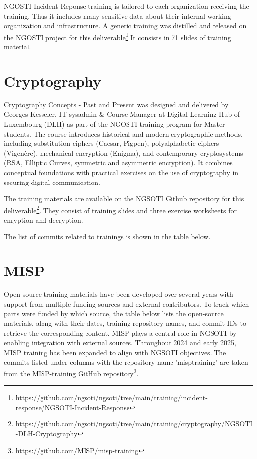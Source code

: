 \documentclass[10pt,a4paper]{report}
\begin{document}
NGOSTI Incident Reponse training is tailored to each organization receiving the
training. Thus it includes many sensitive data about their internal working
organization and infrastructure.
A generic training was distilled and released on the NGOSTI project for this
deliverable\footnote{\url{https://github.com/ngsoti/ngsoti/tree/main/training/incident-response/NGSOTI-Incident-Response}}
It consists in 71 slides of training material.

\section{Cryptography}

Cryptography Concepts - Past and Present was designed and delivered by Georges Kesseler, IT sysadmin \& Course Manager at Digital Learning Hub of Luxembourg (DLH) as part of the NGOSTI training program for Master students. The course introduces historical and modern cryptographic methods, including substitution ciphers (Caesar, Pigpen), polyalphabetic ciphers (Vigenère), mechanical encryption (Enigma), and contemporary cryptosystems (RSA, Elliptic Curves, symmetric and asymmetric encryption). It combines conceptual foundations with practical exercises on the use of cryptography in securing digital communication.

The training materials are available on the NGSOTI Github repository for this deliverable\footnote{\url{https://github.com/ngsoti/ngsoti/tree/main/training/cryptography/NGSOTI-DLH-Cryptography}}. They consist of training slides and three exercise worksheets for enryption and decryption.



The list of commits related to trainings is shown in the table below.

\section{MISP}
Open-source training materials have been developed over several years with support from multiple funding sources and external contributors. To track which parts were funded by which source, the table below lists the open-source materials, along with their dates, training repository names, and commit IDs to retrieve the corresponding content.
MISP plays a central role in NGSOTI by enabling integration with external sources. Throughout 2024 and early 2025, MISP training has been expanded to align with NGSOTI objectives.
The commits listed under columns with the repository name 'misptraining' are taken from the MISP-training GitHub repository\footnote{\url{https://github.com/MISP/misp-training}}.
\end{document}
